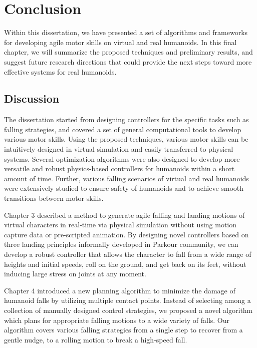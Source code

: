 \chapter{Conclusion}

Within this dissertation, we have presented a set of algorithms and frameworks
for developing agile motor skills on virtual and real humanoids.
In this final chapter, we will summarize the proposed techniques and
preliminary results, and suggest future research directions that could provide
the next steps toward more effective systems for real humanoids.

\section{Discussion}
The dissertation started from designing controllers for the specific tasks
such as falling strategies,
and covered a set of general computational tools to develop
various motor skills.
Using the proposed techniques, various motor skills can be intuitively designed
in virtual simulation and easily transferred to physical systems.
Several optimization algorithms were also designed to develop more versatile and
robust physics-based controllers for humanoids within a short amount of time.
Further, various falling scenarios of virtual and real humanoids were
extensively studied to ensure safety of humanoids and to achieve smooth
transitions between motor skills.

Chapter 3 described a method to generate agile falling and landing motions of
virtual characters in real-time via physical simulation
without using motion capture data or pre-scripted animation.
By designing novel controllers based on three landing principles informally
developed in Parkour community, we can develop a robust controller that
allows the character to fall from a wide range of heights and initial speeds,
roll on the ground, and get back on its feet, without inducing large stress on
joints at any moment.

Chapter 4 introduced a new planning algorithm to minimize the damage
of humanoid falls by utilizing multiple contact points.
Instead of selecting among a collection of manually designed control
strategies, we proposed a novel algorithm which plans for appropriate
falling motions to a wide variety of falls.
Our algorithm covers various falling strategies from a single step to recover
from a gentle nudge, to a rolling motion to break a high-speed fall.

